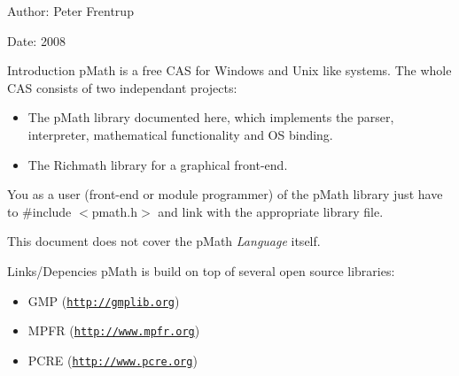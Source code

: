 \begin{Desc}
\item[Author:]Peter Frentrup \end{Desc}
\begin{Desc}
\item[Date:]2008\end{Desc}
\begin{Desc}
\item[Introduction]pMath is a free CAS for Windows and Unix like systems. The whole CAS consists of two independant projects:\begin{itemize}
\item The pMath library documented here, which implements the parser, interpreter, mathematical functionality and OS binding.\item The Richmath library for a graphical front-end.\end{itemize}
\end{Desc}
You as a user (front-end or module programmer) of the pMath library just have to \#include $<$pmath.h$>$ and link with the appropriate library file.

This document does not cover the pMath {\em Language\/} itself.

\begin{Desc}
\item[Links/Depencies]pMath is build on top of several open source libraries:\begin{itemize}
\item GMP (\href{http://gmplib.org}{\tt http://gmplib.org})\item MPFR (\href{http://www.mpfr.org}{\tt http://www.mpfr.org})\item PCRE (\href{http://www.pcre.org}{\tt http://www.pcre.org}) \end{itemize}
\end{Desc}
